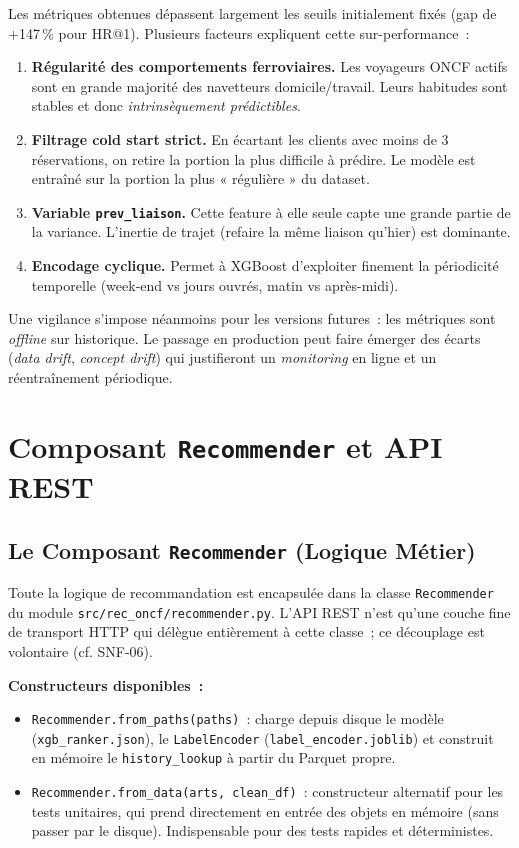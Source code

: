 \documentclass[11pt, a4paper]{article}
\begin{document}
Les métriques obtenues dépassent largement les seuils initialement
fixés (gap de +147\,\% pour HR@1). Plusieurs facteurs expliquent cette
sur-performance~:
\begin{enumerate}
\item \textbf{Régularité des comportements ferroviaires.} Les
    voyageurs ONCF actifs sont en grande majorité des navetteurs
    domicile/travail. Leurs habitudes sont stables et donc
    \textit{intrinsèquement prédictibles}.
\item \textbf{Filtrage cold start strict.} En écartant les clients
    avec moins de 3 réservations, on retire la portion la plus
    difficile à prédire. Le modèle est entraîné sur la portion la plus
    « régulière » du dataset.
\item \textbf{Variable \texttt{prev\_liaison}.} Cette feature à elle
    seule capte une grande partie de la variance. L'inertie de trajet
    (refaire la même liaison qu'hier) est dominante.
\item \textbf{Encodage cyclique.} Permet à XGBoost d'exploiter
    finement la périodicité temporelle (week-end vs jours ouvrés,
    matin vs après-midi).
\end{enumerate}

Une vigilance s'impose néanmoins pour les versions futures~: les
métriques sont \textit{offline} sur historique. Le passage en
production peut faire émerger des écarts (\textit{data drift},
\textit{concept drift}) qui justifieront un \textit{monitoring} en
ligne et un réentraînement périodique.

\newpage
\section{Composant \texttt{Recommender} et API REST}

\subsection{Le Composant \texttt{Recommender} (Logique Métier)}

Toute la logique de recommandation est encapsulée dans la classe
\texttt{Recommender} du module \texttt{src/rec\_oncf/recommender.py}.
L'API REST n'est qu'une couche fine de transport HTTP qui délègue
entièrement à cette classe~; ce découplage est volontaire (cf.
SNF-06).

\textbf{Constructeurs disponibles~:}
\begin{itemize}
\item \texttt{Recommender.from\_paths(paths)}~: charge depuis disque
    le modèle (\texttt{xgb\_ranker.json}), le \texttt{LabelEncoder}
    (\texttt{label\_encoder.joblib}) et construit en mémoire le
    \texttt{history\_lookup} à partir du Parquet propre.
\item \texttt{Recommender.from\_data(arts, clean\_df)}~:
    constructeur alternatif pour les tests unitaires, qui prend
    directement en entrée des objets en mémoire (sans passer par le
    disque). Indispensable pour des tests rapides et déterministes.
\end{itemize}
\end{document}
